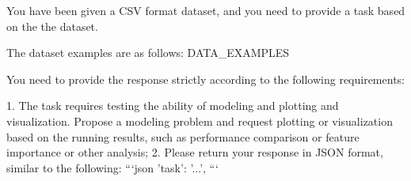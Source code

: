 
\begin{tcolorbox}[colback=cadmiumgreen!5!white,colframe=forestgreen!75!white,breakable,title=\textit{Prompt for task construction in visualization from modeling.}]
\begin{VerbatimWrap}
You have been given a CSV format dataset, and you need to provide a task based on the the dataset.

The dataset examples are as follows:
{{DATA_EXAMPLES}}

You need to provide the response strictly according to the following requirements:

1. The task requires testing the ability of modeling and plotting and visualization. Propose a modeling problem and request plotting or visualization based on the running results, such as performance comparison or feature importance or other analysis;
2. Please return your response in JSON format, similar to the following:
```json
{
    'task': '...',
}
```
\end{VerbatimWrap}
\end{tcolorbox}
